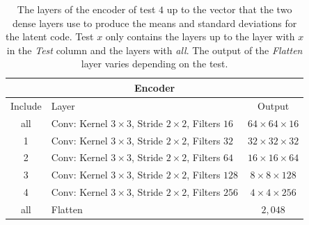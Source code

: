 \begin{center}
    \begin{table}[H]
        \centering
        \begin{tabular}{ | c | l | c | }
            \multicolumn{3}{c}{Encoder} \\ \hline
            Include &Layer & Output\\ \hline
            all &Conv: Kernel $3\times3$, Stride $2\times2$, Filters $16 $    & $64\times 64\times 16 $    \\  
            1   &Conv: Kernel $3\times3$, Stride $2\times2$, Filters $32 $    & $32\times 32\times 32 $    \\
            2   &Conv: Kernel $3\times3$, Stride $2\times2$, Filters $64 $    & $16\times 16\times 64 $    \\
            3   &Conv: Kernel $3\times3$, Stride $2\times2$, Filters $128$    & $8\times 8\times   128$    \\
            4   &Conv: Kernel $3\times3$, Stride $2\times2$, Filters $256$    & $4\times 4\times   256$    \\
            all &Flatten                                                      & $2,048$                    \\
            \hline
        \end{tabular} 
        \caption{The layers of the encoder of test $4$ up to the vector that the two dense layers use to produce 
        the means and standard deviations for the latent code. Test $x$ only contains the layers up to
        the layer with $x$ in the \textit{Test} column and the layers with \textit{all}.
         The output of the \textit{Flatten} layer
        varies depending on the test.}
    \end{table}
\end{center}
\vspace{-4em}
